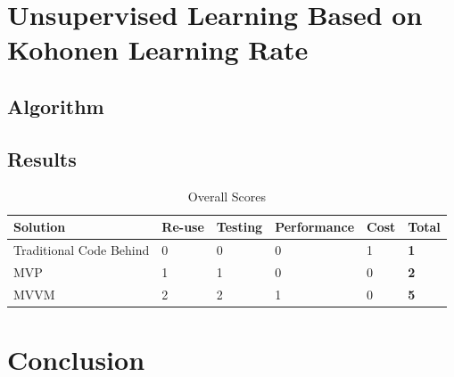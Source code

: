 \documentclass[ece]{uw-wkrpt}
\begin{document}
\section{ Unsupervised Learning Based on Kohonen Learning Rate    }
\subsection{ Algorithm}
\subsection{Results}
\begin{table}
\begin{center}
    \begin{tabular}{ | l | l | l | l | l | l |}
    \hline
    Solution & Re-use &Testing & Performance & Cost & Total  \\ \hline
    Traditional Code Behind & 0 & 0 & 0 & 1 &  \textbf 1  \\ \hline
    MVP & 1 & 1 & 0 & 0 &  \textbf 2  \\ \hline
    MVVM & 2 & 2 & 1 & 0 &  \textbf 5  \\ \hline
    \hline
    \end{tabular}
\end{center}
\caption{ Overall Scores}
	\label{table:overall}
\end{table}
 
\section{Conclusion}





\backmatter


%


\end{document}
